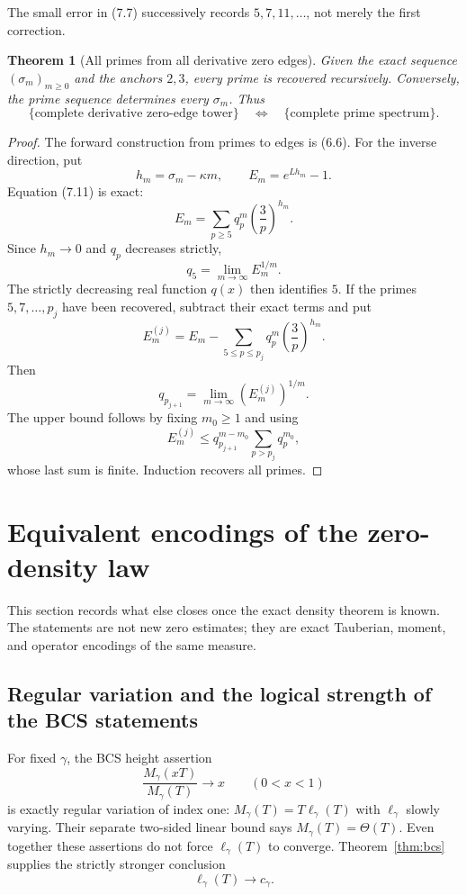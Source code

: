 \documentclass[11pt]{article}
\newtheorem{theorem}{Theorem}[section]
\theoremstyle{definition}
\theoremstyle{remark}
\begin{document}
The small error in (7.7) successively records $5,7,11,\ldots$, not merely the first
correction.

\begin{theorem}[All primes from all derivative zero edges]
\label{thm:edge-recovery}
Given the exact sequence $(\sigma_m)_{m\ge0}$ and the anchors $2,3$, every prime is
recovered recursively.  Conversely, the prime sequence determines every $\sigma_m$.
Thus
\[
 \boxed{
 \{\text{complete derivative zero-edge tower}\}
 \quad\Longleftrightarrow\quad
 \{\text{complete prime spectrum}\}.
 }
\tag{7.12}
\]
\end{theorem}

\begin{proof}
The forward construction from primes to edges is (6.6).  For the inverse direction,
put
\[
 h_m=\sigma_m-\kappa m,
 \qquad E_m=e^{Lh_m}-1.
\]
Equation (7.11) is exact:
\[
 E_m=\sum_{p\ge5}q_p^m\left(\frac3p\right)^{h_m}.
\tag{7.13}
\]
Since $h_m\to0$ and $q_p$ decreases strictly,
\[
 q_5=\lim_{m\to\infty}E_m^{1/m}.
\tag{7.14}
\]
The strictly decreasing real function $q(x)$ then identifies $5$.  If the primes
$5,7,\ldots,p_j$ have been recovered, subtract their exact terms and put
\[
 E_m^{(j)}=E_m-
 \sum_{5\le p\le p_j}q_p^m\left(\frac3p\right)^{h_m}.
\]
Then
\[
 q_{p_{j+1}}=\lim_{m\to\infty}(E_m^{(j)})^{1/m}.
\tag{7.15}
\]
The upper bound follows by fixing $m_0\ge1$ and using
\[
 E_m^{(j)}\le q_{p_{j+1}}^{m-m_0}
 \sum_{p>p_j}q_p^{m_0},
\]
whose last sum is finite.  Induction recovers all primes.
\end{proof}


\section{Equivalent encodings of the zero-density law}
\label{sec:equivalences}

This section records what else closes once the exact density theorem is known.  The
statements are not new zero estimates; they are exact Tauberian, moment, and operator
encodings of the same measure.

\subsection{Regular variation and the logical strength of the BCS statements}

For fixed $\gamma$, the BCS height assertion
\[
 \frac{M_\gamma(xT)}{M_\gamma(T)}\longrightarrow x
 \qquad(0<x<1)
\tag{8.1}
\]
is exactly regular variation of index one:
$M_\gamma(T)=T\ell_\gamma(T)$ with $\ell_\gamma$ slowly varying.  Their separate
two-sided linear bound says $M_\gamma(T)=\Theta(T)$.  Even together these assertions do
not force $\ell_\gamma(T)$ to converge.  Theorem~\ref{thm:bcs} supplies the strictly
stronger conclusion
\[
 \ell_\gamma(T)\longrightarrow c_\gamma.
\tag{8.2}
\]
\end{document}
